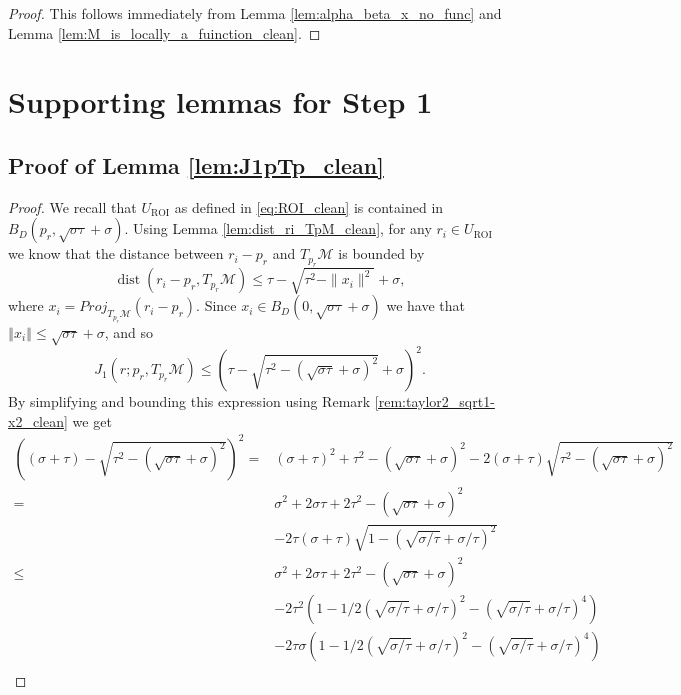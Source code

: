 \documentclass[12pt]{article}
\theoremstyle{remark}
\newcommand{\MM}{\mathcal{M}}
\newcommand{\norm}[1]{\left\Vert #1 \right\Vert}
\newcommand{\dist}{\operatorname{dist}}
\begin{document}
\begin{appendices}
\begin{proof}
 This follows immediately from Lemma \ref{lem:alpha_beta_x_no_func} and Lemma \ref{lem:M_is_locally_a_fuinction_clean}.
\end{proof}

\section{Supporting lemmas for Step 1}

\subsection{Proof of Lemma \ref{lem:J1pTp_clean}} \label{subsec:proof_lem_J1pTp_clean}

\begin{proof}
We recall that $ U_\textrm{ROI} $ as defined in \eqref{eq:ROI_clean} is contained in $ B_D({p_r}, \sqrt{\sigma\tau} + \sigma) $.
Using Lemma \ref{lem:dist_ri_TpM_clean}, for any $r_i\in U_\textrm{ROI}$ we know that the distance between $r_i - p_r$ and $ T_{{p_r}}\MM $ is bounded by 
\begin{equation}\label{eq:d_ri_Tp_clean}
\dist(r_i - p_r,T_{{p_r}}\MM) \leq \tau-\sqrt{\tau^2-\|x_i\|^2}  + \sigma
,\end{equation}
where $ x_i = Proj_{T_{p_r}\MM}(r_i - p_r) $.
Since $ x_i \in B_D(0, \sqrt{\sigma\tau}+\sigma )$ we have that $\norm{x_i} \leq \sqrt{\sigma\tau}+\sigma $, and so
\[
J_1(r; {p_r}, T_{{p_r}}\MM) \leq \left(\tau-\sqrt{\tau^2-(\sqrt{\sigma\tau}+\sigma)^2} + \sigma\right)^2 
.\]
By simplifying and bounding this expression using Remark \ref{rem:taylor2_sqrt1-x2_clean} we get
	\begin{align*}
		\left((\sigma+\tau)-\sqrt{\tau^2-(\sqrt{\sigma\tau}+\sigma)^2}\right)^2 = & (\sigma+\tau)^2 + \tau^2-(\sqrt{\sigma\tau}+\sigma)^2 - 2(\sigma+\tau) \sqrt{\tau^2-(\sqrt{\sigma\tau}+\sigma)^2}\\
		= &
		\sigma^2 + 2\sigma\tau + 2 \tau^2 -  (\sqrt{\sigma\tau}+\sigma)^2 \\
		&- 2\tau(\sigma+\tau) \sqrt{1-(\sqrt{\sigma/\tau}+\sigma/\tau)^2}\\
		\leq &
		\sigma^2 + 2\sigma\tau + 2 \tau^2 - (\sqrt{\sigma\tau}+\sigma)^2\\
		& - 2\tau^2 (1-1/2 (\sqrt{\sigma/\tau}+\sigma/\tau)^2- (\sqrt{\sigma/\tau}+\sigma/\tau)^4 )\\& - 2\tau\sigma (1-1/2 (\sqrt{\sigma/\tau}+\sigma/\tau)^2- (\sqrt{\sigma/\tau}+\sigma/\tau)^4)\\

\end{align*}
\end{proof}
\end{appendices}
\end{document}
